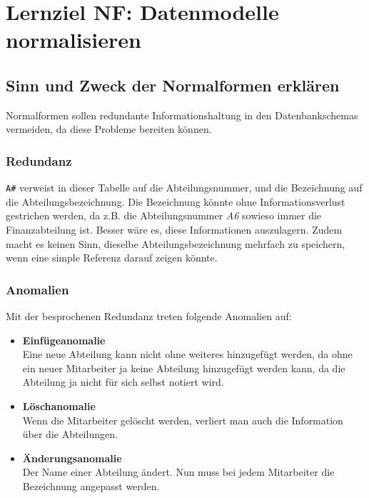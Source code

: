 \section{Lernziel NF: Datenmodelle normalisieren}

\subsection{Sinn und Zweck der Normalformen erklären}
Normalformen sollen redundante Informationshaltung in den Datenbankschemas vermeiden, da diese Probleme bereiten können.

\subsubsection{Redundanz}


\texttt{A\#} verweist in dieser Tabelle auf die Abteilungsnummer, und die Bezeichnung auf die Abteilungsbezeichnung. Die Bezeichnung könnte ohne Informationsverlust gestrichen werden, da z.B. die Abteilungsnummer \textit{A6} sowieso immer die Finanzabteilung ist. Besser wäre es, diese Informationen auszulagern. Zudem macht es keinen Sinn, dieselbe Abteilungsbezeichnung mehrfach zu speichern, wenn eine simple Referenz darauf zeigen könnte.

\newpage

\subsubsection{Anomalien}
Mit der besprochenen Redundanz treten folgende Anomalien auf:

\begin{itemize}
  \item \textbf{Einfügeanomalie} \\
  Eine neue Abteilung kann nicht ohne weiteres hinzugefügt werden, da ohne ein neuer Mitarbeiter ja keine Abteilung hinzugefügt werden kann, da die Abteilung ja nicht für sich selbst notiert wird.
  \item \textbf{Löschanomalie} \\
  Wenn die Mitarbeiter gelöscht werden, verliert man auch die Information über die Abteilungen.
  \item \textbf{Änderungsanomalie} \\
  Der Name einer Abteilung ändert. Nun muss bei jedem Mitarbeiter die Bezeichnung angepasst werden.
\end{itemize}

